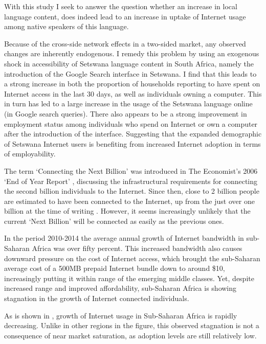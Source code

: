 \documentclass[a4paper,british]{article}\usepackage[]{graphicx}\usepackage[]{color}
\begin{document}
With this study I seek to answer the question whether an increase
in local language content, does indeed lead to an increase in uptake
of Internet usage among native speakers of this language.

Because of the cross-side network effects in a two-sided market, any
observed changes are inherently endogenous. I remedy this problem
by using an exogenous shock in accessibility of Setswana language
content in South Africa, namely the introduction of the Google Search
interface in Setswana. I find that this leads to a strong increase
in both the proportion of households reporting to have spent on Internet
access in the last 30 days, as well as individuals owning a computer.
This in turn has led to a large increase in the usage of the Setswana
language online (in Google search queries). There also appears to
be a strong improvement in employment status among individuals who
spend on Internet or own a computer after the introduction of the
interface. Suggesting that the expanded demographic of Setswana Internet
users is benefiting from increased Internet adoption in terms of employability.

The term `Connecting the Next Billion' was introduced in The Economist's
2006 `End of Year Report' \citep{standage2006connecting}, discussing
the infrastructural requirements for connecting the second billion
individuals to the Internet. Since then, close to 2 billion people
are\emph{ }estimated to have been connected to the Internet, up from
the just over one billion at the time of writing \citep{sanou2015world}.
However, it seems increasingly unlikely that the current `Next Billion'
will be connected as easily as the previous ones. 

In the period 2010-2014 the average annual growth of Internet bandwidth
in sub-Saharan Africa was over fifty percent. This increased bandwidth
also causes downward pressure on the cost of Internet access, which
brought the sub-Saharan average cost of a 500MB prepaid Internet bundle
down to around \$10, increasingly putting it within range of the emerging
middle classes. Yet, despite increased range and improved affordability,
sub-Saharan Africa is showing stagnation in the growth of Internet
connected individuals.

As is shown in , growth of Internet usage
in Sub-Saharan Africa is rapidly decreasing. Unlike in other regions
in the figure, this observed stagnation is not a consequence of near
market saturation, as adoption levels are still relatively low.
\end{document}
